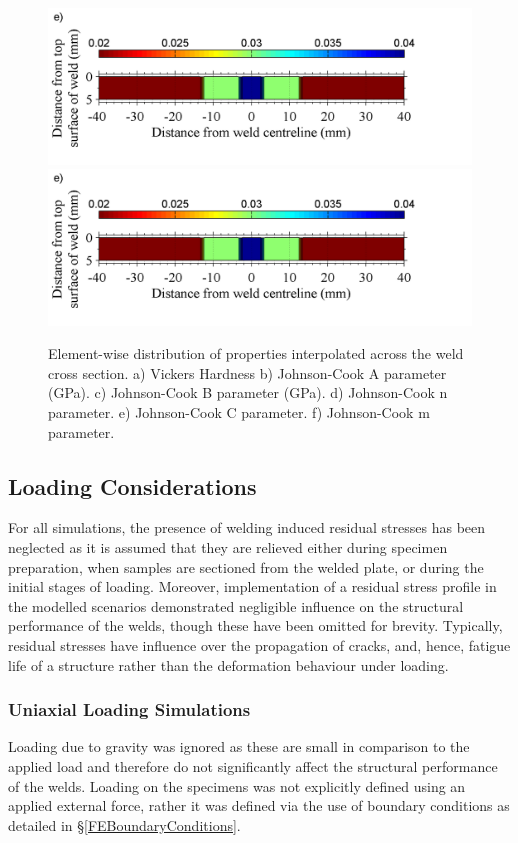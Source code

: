 \begin{figure}[h!]
	\includegraphics[width=1\linewidth]{JCCaltered}
	\includegraphics[width=1\linewidth]{JCCaltered}
	\caption[Mesh]{Element-wise distribution of properties interpolated across the weld cross section. a) Vickers Hardness b) Johnson-Cook A parameter (GPa). c) Johnson-Cook B parameter (GPa). d) Johnson-Cook n parameter. e) Johnson-Cook C parameter. f) Johnson-Cook m parameter.}
	\label{fig:colormaps}
\end{figure} 

\subsection{Loading Considerations}
\label{FELoadingConsiderations}
For all simulations, the presence of welding induced residual stresses has been neglected as it is assumed that they are relieved either during specimen preparation, when samples are sectioned from the welded plate, or during the initial stages of loading. Moreover, implementation of a residual stress profile in the modelled scenarios demonstrated negligible influence on the structural performance of the welds, though these have been omitted for brevity. Typically, residual stresses have influence over the propagation of cracks, and, hence, fatigue life of a structure rather than the deformation behaviour under loading. 
\subsubsection{Uniaxial Loading Simulations}
\label{FEUniaxialTension}
Loading due to gravity was ignored as these are small in comparison to the applied load and therefore do not significantly affect the structural performance of the welds. Loading on the specimens was not explicitly defined using an applied external force, rather it was defined via the use of boundary conditions as detailed in \S\ref{FEBoundaryConditions}.
